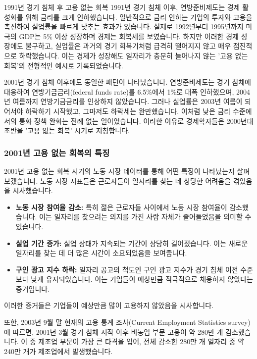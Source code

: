 \documentclass[11pt,a4paper]{article}
\theoremstyle{definition}
\begin{document}
\begin{examplebox}{1991년 경기 침체 후 고용 없는 회복}
1991년 경기 침체 이후, 연방준비제도는 경제 활성화를 위해 금리를 크게 인하했습니다. 일반적으로 금리 인하는 기업의 투자와 고용을 촉진하여 실업률을 빠르게 낮추는 효과가 있습니다. 실제로 1992년부터 1995년까지 미국의 GDP는 5\% 이상 성장하며 경제는 회복세를 보였습니다. 하지만 이러한 경제 성장에도 불구하고, 실업률은 과거의 경기 회복기처럼 급격히 떨어지지 않고 매우 점진적으로 하락했습니다. 이는 경제가 성장해도 일자리가 충분히 늘어나지 않는 '고용 없는 회복'의 전형적인 예시로 기록되었습니다.
\end{examplebox}

2001년 경기 침체 이후에도 동일한 패턴이 나타났습니다. 연방준비제도는 경기 침체에 대응하여 연방기금금리(federal funds rate)를 6.5\%에서 1\%로 대폭 인하했으며, 2004년 여름까지 연방기금금리를 인상하지 않았습니다. 그러나 실업률은 2003년 여름이 되어서야 하락하기 시작했고, 그마저도 하락세는 완만했습니다. 이처럼 낮은 금리 수준에서의 통화 정책 완화는 전례 없는 일이었습니다. 이러한 이유로 경제학자들은 2000년대 초반을 '고용 없는 회복' 시기로 지칭합니다.

\subsubsection{2001년 고용 없는 회복의 특징}
2001년 고용 없는 회복 시기의 노동 시장 데이터를 통해 어떤 특징이 나타났는지 살펴보겠습니다. 노동 시장 지표들은 근로자들이 일자리를 찾는 데 상당한 어려움을 겪었음을 시사했습니다.

\begin{itemize}
    \item \textbf{노동 시장 참여율 감소:} 특히 젊은 근로자들 사이에서 노동 시장 참여율이 감소했습니다. 이는 일자리를 찾으려는 의지를 가진 사람 자체가 줄어들었음을 의미할 수 있습니다.
    \item \textbf{실업 기간 증가:} 실업 상태가 지속되는 기간이 상당히 길어졌습니다. 이는 새로운 일자리를 찾는 데 더 많은 시간이 소요되었음을 보여줍니다.
    \item \textbf{구인 광고 지수 하락:} 일자리 공고의 척도인 구인 광고 지수가 경기 침체 이전 수준보다 낮게 유지되었습니다. 이는 기업들이 예상만큼 적극적으로 채용하지 않았다는 증거입니다.
\end{itemize}
이러한 증거들은 기업들이 예상만큼 많이 고용하지 않았음을 시사합니다.

또한, 2003년 9월 말 현재의 고용 통계 조사(Current Employment Statistics survey)에 따르면, 2001년 3월 경기 침체 시작 이후 비농업 부문 고용이 약 280만 개 감소했습니다. 이 중 제조업 부문이 가장 큰 타격을 입어, 전체 감소한 280만 개 일자리 중 약 240만 개가 제조업에서 발생했습니다.
\end{document}
